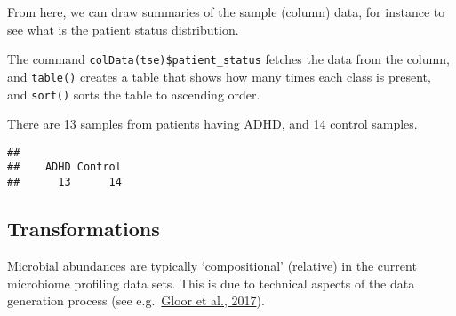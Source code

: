 \documentclass[
  oneside]{book}
\newenvironment{Shaded}{\begin{snugshade}}{\end{snugshade}}
\newcommand{\FunctionTok}[1]{\textcolor[rgb]{0.00,0.00,0.00}{#1}}
\newcommand{\NormalTok}[1]{#1}
\newcommand{\SpecialCharTok}[1]{\textcolor[rgb]{0.00,0.00,0.00}{#1}}
\begin{document}
\begin{table}
\centering
{}
\end{table}

From here, we can draw summaries of the sample (column) data, for
instance to see what is the patient status distribution.

The command \texttt{colData(tse)\$patient\_status} fetches the data from the
column, and \texttt{table()} creates a table that shows how many times each
class is present, and \texttt{sort()} sorts the table to ascending order.

There are 13
samples from patients having ADHD,
and 14 control samples.

\begin{Shaded}
\end{Shaded}

\begin{verbatim}
## 
##    ADHD Control 
##      13      14
\end{verbatim}

\hypertarget{transformations}{%
\subsection{Transformations}\label{transformations}}

Microbial abundances are typically `compositional' (relative) in the
current microbiome profiling data sets. This is due to technical
aspects of the data generation process (see e.g.~\href{https://www.frontiersin.org/articles/10.3389/fmicb.2017.02224/full}{Gloor et al.,
2017}).
\end{document}
